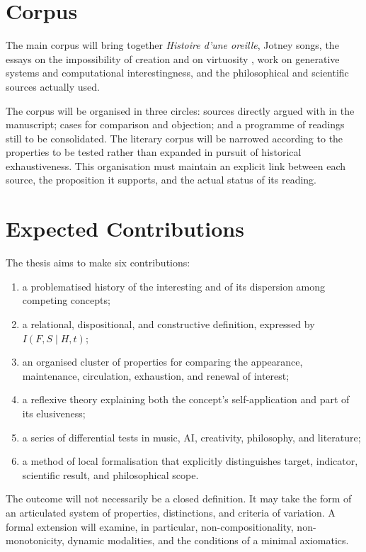 \documentclass[11pt,a4paper]{article}
\begin{document}
\section{Corpus}

The main corpus will bring together \emph{Histoire d'une oreille}, Jotney songs,
the essays on the impossibility of creation and on virtuosity
\parencite{pachet2018oreille,pachet2026impossibilite,pachet2026virtuosite}, work
on generative systems and computational interestingness, and the philosophical
and scientific sources actually used.

The corpus will be organised in three circles: sources directly argued with in
the manuscript; cases for comparison and objection; and a programme of readings
still to be consolidated. The literary corpus will be narrowed according to the
properties to be tested rather than expanded in pursuit of historical
exhaustiveness. This organisation must maintain an explicit link between each
source, the proposition it supports, and the actual status of its reading.

\section{Expected Contributions}

The thesis aims to make six contributions:

\begin{enumerate}
  \item a problematised history of the interesting and of its dispersion among
        competing concepts;
  \item a relational, dispositional, and constructive definition, expressed by
        \(I(F,S\mid H,t)\);
  \item an organised cluster of properties for comparing the appearance,
        maintenance, circulation, exhaustion, and renewal of interest;
  \item a reflexive theory explaining both the concept's self-application and
        part of its elusiveness;
  \item a series of differential tests in music, AI, creativity, philosophy,
        and literature;
  \item a method of local formalisation that explicitly distinguishes target,
        indicator, scientific result, and philosophical scope.
\end{enumerate}

The outcome will not necessarily be a closed definition. It may take the form
of an articulated system of properties, distinctions, and criteria of
variation. A formal extension will examine, in particular,
non-compositionality, non-monotonicity, dynamic modalities, and the conditions
of a minimal axiomatics.
\end{document}
